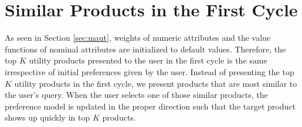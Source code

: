 \section{Similar Products in the First Cycle}
As seen in Section \ref{sec:maut}, weights of numeric attributes and the value functions of nominal attributes are initialized to default values.
Therefore, the top $K$ utility products presented to the user in the first cycle is the same irrespective of initial preferences given by the user.
Instead of presenting the top $K$ utility products in the first cycle, we present products that are most similar to the user's query.
When the user selects one of those similar products, the preference model is updated in the proper direction such that the target product shows up quickly in top $K$ products.
